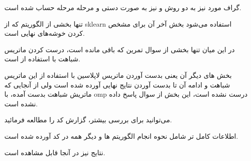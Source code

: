 \documentclass[a4paper, 12pt]{article}
\begin{document}
	گراف مورد نیز به دو روش 
	و 
	نیز به صورت دستی و مرحله مرحله حساب شده است. 
	
	تنها بخشی از الگوریتم 
	که از sklearn
	استفاده می‌شود بخش آخر آن برای مشخص کردن خوشه‌های نهایی است. 
	
	در این میان تنها بخشی از سوال تمرین که باقی مانده است، درست کردن ماتریس شباهت با استفاده از 
	است.
	
	بخش های دیگر آن یعنی بدست آوردن ماتریس لاپلاسین با استفاده از این ماتریس شباهت و ادامه آن تا بدست آوردن نتایج نهایی آورده شده است ولی از آنجایی که ماتریش شباهت بدست آمده، با 
	omp 
	درست نشده است، این بخش از سوال پاسخ داده نشده است. 
	
	می‌توانید برای بررسی بیشتر، گزارش کد را مطالعه فرمائید.
	
	اطلاعات کامل تر شامل نحوه انجام الگوریتم ها و دیگر همه در کد آورده شده است.
	
	نتایج نیز در آنجا قابل مشاهده است.	
\end{document}
